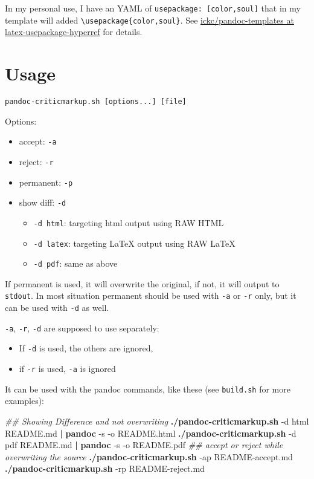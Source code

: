 \documentclass[]{article}
\newenvironment{Shaded}{}{}
\newcommand{\KeywordTok}[1]{\textcolor[rgb]{0.00,0.44,0.13}{\textbf{{#1}}}}
\newcommand{\CommentTok}[1]{\textcolor[rgb]{0.38,0.63,0.69}{\textit{{#1}}}}
\newcommand{\NormalTok}[1]{{#1}}
\providecommand{\tightlist}{%
  \setlength{\itemsep}{0pt}\setlength{\parskip}{0pt}}
\begin{document}
In my personal use, I have an YAML of
\texttt{usepackage:\ {[}color,soul{]}} that in my template will added
\texttt{\textbackslash{}usepackage\{color,soul\}}. See
\href{https://github.com/ickc/pandoc-templates/tree/latex-usepackage-hyperref}{ickc/pandoc-templates
at latex-usepackage-hyperref} for details.

\section{Usage}\label{usage}

\texttt{pandoc-criticmarkup.sh\ {[}options...{]}\ {[}file{]}}

Options:

\begin{itemize}
\tightlist
\item
  accept: \texttt{-a}
\item
  reject: \texttt{-r}
\item
  permanent: \texttt{-p}
\item
  show diff: \texttt{-d}

  \begin{itemize}
  \tightlist
  \item
    \texttt{-d\ html}: targeting html output using RAW HTML
  \item
    \texttt{-d\ latex}: targeting LaTeX output using RAW LaTeX
  \item
    \texttt{-d\ pdf}: same as above
  \end{itemize}
\end{itemize}

If permanent is used, it will overwrite the original, if not, it will
output to \texttt{stdout}. In most situation permanent should be used
with \texttt{-a} or \texttt{-r} only, but it can be used with
\texttt{-d} as well.

\texttt{-a}, \texttt{-r}, \texttt{-d} are supposed to use separately:

\begin{itemize}
\tightlist
\item
  If \texttt{-d} is used, the others are ignored,
\item
  if \texttt{-r} is used, \texttt{-a} is ignored
\end{itemize}

It can be used with the pandoc commands, like these (see
\texttt{build.sh} for more examples):

\begin{Shaded}
\begin{Highlighting}[]
\CommentTok{## Showing Difference and not overwriting}
\KeywordTok{./pandoc-criticmarkup.sh} \NormalTok{-d html README.md }\KeywordTok{|} \KeywordTok{pandoc} \NormalTok{-s -o README.html}
\KeywordTok{./pandoc-criticmarkup.sh} \NormalTok{-d pdf README.md }\KeywordTok{|} \KeywordTok{pandoc} \NormalTok{-s -o README.pdf}
\CommentTok{## accept or reject while overwriting the source}
\KeywordTok{./pandoc-criticmarkup.sh} \NormalTok{-ap README-accept.md}
\KeywordTok{./pandoc-criticmarkup.sh} \NormalTok{-rp README-reject.md}
\end{Highlighting}
\end{Shaded}
\end{document}
